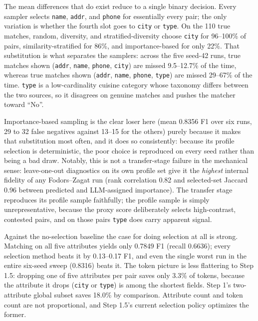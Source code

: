 \documentclass[11pt]{article}
\begin{document}
The mean differences that do exist reduce to a single binary decision. Every sampler
selects \texttt{name}, \texttt{addr}, and \texttt{phone} for essentially every
pair; the only variation is whether the fourth slot goes to \texttt{city} or
\texttt{type}. On the 110 true matches, random, diversity, and stratified-diversity
choose \texttt{city} for 96--100\% of pairs, similarity-stratified for 86\%, and
importance-based for only 22\%. That substitution is what separates the samplers:
across the five seed-42 runs, true matches shown (\texttt{addr}, \texttt{name},
\texttt{phone}, \texttt{city}) are missed 9.5--12.7\% of the time, whereas true
matches shown (\texttt{addr}, \texttt{name}, \texttt{phone}, \texttt{type}) are
missed 29--67\% of the time. \texttt{type} is a low-cardinality cuisine category
whose taxonomy differs between the two sources, so it disagrees on genuine matches
and pushes the matcher toward ``No''.

Importance-based sampling is the clear loser here (mean 0.8356 F1 over six runs, 29
to 32 false negatives against 13--15 for the others) purely because it makes that
substitution most often, and it does so consistently: because its profile selection
is deterministic, the poor choice is reproduced on every seed rather than being a
bad draw. Notably, this is not a transfer-stage failure in the mechanical sense:
leave-one-out diagnostics on its own profile set give it the \emph{highest} internal
fidelity of any Fodors--Zagat run (rank correlation 0.82 and selected-set Jaccard
0.96 between predicted and LLM-assigned importance). The transfer stage reproduces
its profile sample faithfully; the profile sample is simply unrepresentative,
because the proxy score deliberately selects high-contrast, contested pairs, and on
those pairs \texttt{type} does carry apparent signal.

Against the no-selection baseline the case for doing selection at all is strong.
Matching on all five attributes yields only 0.7849 F1 (recall 0.6636); every
selection method beats it by 0.13--0.17 F1, and even the single worst run in the
entire six-seed sweep (0.8316) beats it. The token picture is less flattering to
Step 1.5: dropping one of five attributes per pair saves only 3.3\% of tokens,
because the attribute it drops (\texttt{city} or \texttt{type}) is among the
shortest fields. Step 1's two-attribute global subset saves 18.0\% by comparison.
Attribute count and token count are not proportional, and Step 1.5's current
selection policy optimizes the former.
\end{document}
